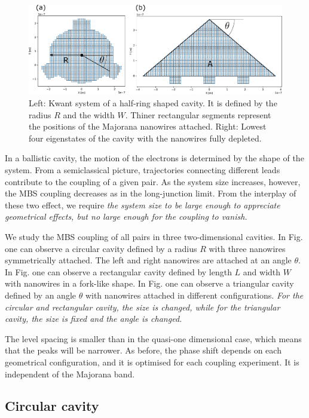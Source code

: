 \begin{figure}[h!]
\centering
  \includegraphics[width=0.7\linewidth]{figures/2d_cavities.pdf}
  \caption{Left: Kwant system of a half-ring shaped cavity. It is defined by the radius $R$ and the width $W$. Thiner rectangular segments represent the positions of the Majorana nanowires attached. Right: Lowest four eigenstates of the cavity with the nanowires fully depleted.}
  \label{fig:2d}
\end{figure}

In a ballistic cavity, the motion of the electrons is determined by the shape of the system.
From a semiclassical picture, trajectories connecting different leads contribute to the coupling of a given pair.
As the system size increases, however, the MBS coupling decreases as in the long-junction limit.
From the interplay of these two effect, we require \textit{the system size to be large enough to appreciate geometrical effects, but no large enough for the coupling to vanish.}

We study the MBS coupling of all pairs in three two-dimensional cavities. 
In Fig. one can observe a circular cavity defined by a radius $R$ with three nanowires symmetrically attached.
The left and right nanowires are attached at an angle $\theta$.
In Fig. one can observe a rectangular cavity defined by length $L$ and width $W$ with nanowires in a fork-like shape.
In Fig. one can observe a triangular cavity defined by an angle $\theta$ with nanowires attached in different configurations.
\textit{For the circular and rectangular cavity, the size is changed, while for the triangular cavity, the size is fixed and the angle is changed.}

The level spacing is smaller than in the quasi-one dimensional case, which means that the peaks will be narrower.
As before, the phase shift depends on each geometrical configuration, and it is optimised for each coupling experiment.
It is independent of the Majorana band.


\subsection{Circular cavity}

